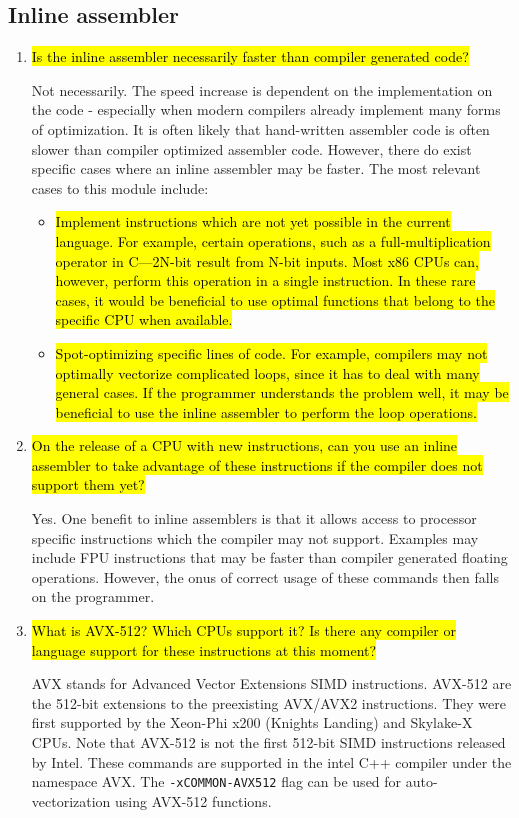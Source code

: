 \documentclass{article}
\begin{document}
\subsection{Inline assembler}
\begin{enumerate}
	\item \hl{Is the inline assembler necessarily faster than compiler generated code?}

	Not necessarily. The speed increase is dependent on the implementation on the code - especially when modern compilers already implement many forms of optimization. It is often likely that hand-written assembler code is often slower than compiler optimized assembler code. However, there do exist specific cases where an inline assembler may be faster. The most relevant cases to this module include:
	\begin{itemize}
		\item \hl{Implement instructions which are not yet possible in the current language. For example, certain operations, such as a full-multiplication operator in C---2N-bit result from N-bit inputs. Most x86 CPUs can, however, perform this operation in a single instruction. In these rare cases, it would be beneficial to use optimal functions that belong to the specific CPU when available.}

		\item \hl{Spot-optimizing specific lines of code. For example, compilers may not optimally vectorize complicated loops, since it has to deal with many general cases. If the programmer understands the problem well, it may be beneficial to use the inline assembler to perform the loop operations.}
	\end{itemize}
	
	\item \hl{On the release of a CPU with new instructions, can you use an inline assembler to take advantage of these instructions if the compiler does not support them yet?}

	Yes. One benefit to inline assemblers is that it allows access to processor specific instructions which the compiler may not support. Examples may include FPU instructions that may be faster than compiler generated floating operations. However, the onus of correct usage of these commands then falls on the programmer.
	
	\item \hl{What is AVX-512? Which CPUs support it? Is there any compiler or language support for these instructions at this moment?}

	AVX stands for Advanced Vector Extensions SIMD instructions. AVX-512 are the 512-bit extensions to the preexisting AVX/AVX2 instructions. They were first supported by the Xeon-Phi x200 (Knights Landing) and Skylake-X CPUs. Note that AVX-512 is not the first 512-bit SIMD instructions released by Intel. These commands are supported in the intel C++ compiler under the namespace AVX. The \verb!-xCOMMON-AVX512! flag can be used for auto-vectorization using AVX-512 functions.
\end{enumerate}
\end{document}
